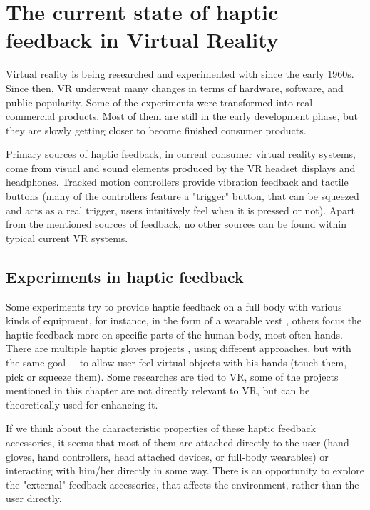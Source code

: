 \chapter{The current state of haptic feedback in Virtual Reality}

Virtual reality is being researched and experimented with since the early 1960s.
\hyperlink{vrhistory}{} Since then, VR underwent many changes in terms of hardware,
software, and public popularity.
Some of the experiments were transformed into real commercial products.
Most of them are still in the early development phase, but they are slowly getting
closer to become finished consumer products.


Primary sources of haptic feedback, in current consumer virtual reality systems,
come from visual and sound elements produced by the VR headset displays and
headphones. Tracked
motion controllers provide vibration feedback and tactile buttons (many of
the controllers feature a "trigger" button, that can be squeezed and acts as
a real trigger, users intuitively feel when it is pressed or not).
Apart from the mentioned sources of feedback, no other sources can be found
within typical current VR systems.


\hypertarget{x-experiments-in-haptic-feedback}{\section{Experiments in haptic feedback}}
Some experiments try to provide haptic feedback on a full body with various
kinds of equipment, for instance, in the form of a wearable vest \hyperlink{tfbhf}{},
others focus the haptic feedback more on specific parts of the
human body, most often hands. There are multiple haptic gloves projects
\hyperlink{haptgloves}{}, using different approaches, but with the same goal — to allow user feel virtual objects with his hands
(touch them, pick or squeeze them). Some researches are tied to VR,
some of the projects mentioned in this chapter are not directly relevant
to VR, but can be theoretically used for enhancing it.


If we think about the characteristic properties of these haptic feedback
accessories, it seems that most of them are attached directly to the
user (hand gloves, hand controllers, head attached devices, or full-body wearables)
or interacting with him/her directly in some way. There is an opportunity to explore
the "external" feedback accessories, that affects the environment, rather than
the user directly.



